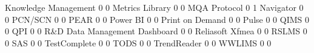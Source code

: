 \documentclass{article}
\begin{document}
\begin{Schunk}
\begin{Soutput}
  Knowledge Management                                                 0   0
  Metrics Library                                                      0   0
  MQA Protocol                                                         0   1
  Navigator                                                            0   0
  PCN/SCN                                                              0   0
  PEAR                                                                 0   0
  Power BI                                                             0   0
  Print on Demand                                                      0   0
  Pulse                                                                0   0
  QIMS                                                                 0   0
  QPI                                                                  0   0
  R&D Data Management Dashboard                                        0   0
  Reliasoft Xfmea                                                      0   0
  RSLMS                                                                0   0
  SAS                                                                  0   0
  TestComplete                                                         0   0
  TODS                                                                 0   0
  TrendReader                                                          0   0
  WWLIMS                                                               0   0
                                                           

\end{Soutput}
\end{Schunk}
\end{document}
